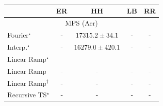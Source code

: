 \begin{tabular}{l|cccc|}
\toprule
            & ER & HH & LB & RR \\
\midrule
\multicolumn{5}{c}{\rule{0pt}{8pt}MPS (Aer)} \\
\midrule
Fourier$^\star$ & {\cellcolor[HTML]{000000}} \color[HTML]{F1F1F1} {\cellcolor{white}} \color{black} - & {\cellcolor[HTML]{4D004B}} \color[HTML]{F1F1F1} $17315.2\pm 34.1$ & {\cellcolor[HTML]{000000}} \color[HTML]{F1F1F1} {\cellcolor{white}} \color{black} - & {\cellcolor[HTML]{000000}} \color[HTML]{F1F1F1} {\cellcolor{white}} \color{black} - \\
Interp.$^\star$ & {\cellcolor[HTML]{000000}} \color[HTML]{F1F1F1} {\cellcolor{white}} \color{black} - & {\cellcolor[HTML]{9AB4D6}} \color[HTML]{000000} $16279.0\pm 420.1$ & {\cellcolor[HTML]{000000}} \color[HTML]{F1F1F1} {\cellcolor{white}} \color{black} - & {\cellcolor[HTML]{000000}} \color[HTML]{F1F1F1} {\cellcolor{white}} \color{black} - \\
Linear Ramp$^\star$ & {\cellcolor[HTML]{000000}} \color[HTML]{F1F1F1} {\cellcolor{white}} \color{black} - & {\cellcolor[HTML]{000000}} \color[HTML]{F1F1F1} {\cellcolor{white}} \color{black} - & {\cellcolor[HTML]{000000}} \color[HTML]{F1F1F1} {\cellcolor{white}} \color{black} - & {\cellcolor[HTML]{000000}} \color[HTML]{F1F1F1} {\cellcolor{white}} \color{black} - \\
Linear Ramp & {\cellcolor[HTML]{000000}} \color[HTML]{F1F1F1} {\cellcolor{white}} \color{black} - & {\cellcolor[HTML]{000000}} \color[HTML]{F1F1F1} {\cellcolor{white}} \color{black} - & {\cellcolor[HTML]{000000}} \color[HTML]{F1F1F1} {\cellcolor{white}} \color{black} - & {\cellcolor[HTML]{000000}} \color[HTML]{F1F1F1} {\cellcolor{white}} \color{black} - \\
Linear Ramp$^\dagger$ & {\cellcolor[HTML]{000000}} \color[HTML]{F1F1F1} {\cellcolor{white}} \color{black} - & {\cellcolor[HTML]{000000}} \color[HTML]{F1F1F1} {\cellcolor{white}} \color{black} - & {\cellcolor[HTML]{000000}} \color[HTML]{F1F1F1} {\cellcolor{white}} \color{black} - & {\cellcolor[HTML]{000000}} \color[HTML]{F1F1F1} {\cellcolor{white}} \color{black} - \\
Recursive TS$^\star$ & {\cellcolor[HTML]{000000}} \color[HTML]{F1F1F1} {\cellcolor{white}} \color{black} - & {\cellcolor[HTML]{000000}} \color[HTML]{F1F1F1} {\cellcolor{white}} \color{black} - & {\cellcolor[HTML]{000000}} \color[HTML]{F1F1F1} {\cellcolor{white}} \color{black} - & {\cellcolor[HTML]{000000}} \color[HTML]{F1F1F1} {\cellcolor{white}} \color{black} - \\

\end{tabular}
